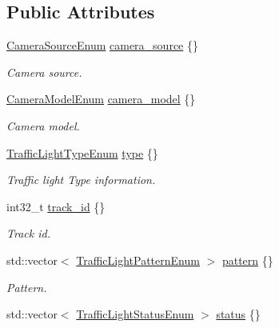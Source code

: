 \subsection*{Public Attributes}
\begin{DoxyCompactItemize}
\item 
\hyperlink{structmaf__perception__interface_1_1CameraSourceEnum}{Camera\+Source\+Enum} \hyperlink{structmaf__perception__interface_1_1TrafficLightMultiFrame_a334b0338a8a394dc246f11ebe67a1112}{camera\+\_\+source} \{\}
\begin{DoxyCompactList}\small\item\em Camera source. \end{DoxyCompactList}\item 
\hyperlink{structmaf__perception__interface_1_1CameraModelEnum}{Camera\+Model\+Enum} \hyperlink{structmaf__perception__interface_1_1TrafficLightMultiFrame_a33c441008015df1522483745efd46dac}{camera\+\_\+model} \{\}
\begin{DoxyCompactList}\small\item\em Camera model. \end{DoxyCompactList}\item 
\hyperlink{structmaf__perception__interface_1_1TrafficLightTypeEnum}{Traffic\+Light\+Type\+Enum} \hyperlink{structmaf__perception__interface_1_1TrafficLightMultiFrame_ac94d2b175b16689e25d5ba992bbada1c}{type} \{\}
\begin{DoxyCompactList}\small\item\em Traffic light Type information. \end{DoxyCompactList}\item 
int32\+\_\+t \hyperlink{structmaf__perception__interface_1_1TrafficLightMultiFrame_a77394e5afb1b785b596250eb89a7bc5e}{track\+\_\+id} \{\}
\begin{DoxyCompactList}\small\item\em Track id. \end{DoxyCompactList}\item 
std\+::vector$<$ \hyperlink{structmaf__perception__interface_1_1TrafficLightPatternEnum}{Traffic\+Light\+Pattern\+Enum} $>$ \hyperlink{structmaf__perception__interface_1_1TrafficLightMultiFrame_a9fc087ee5341cd8603e74ba43d36242c}{pattern} \{\}
\begin{DoxyCompactList}\small\item\em Pattern. \end{DoxyCompactList}\item 
std\+::vector$<$ \hyperlink{structmaf__perception__interface_1_1TrafficLightStatusEnum}{Traffic\+Light\+Status\+Enum} $>$ \hyperlink{structmaf__perception__interface_1_1TrafficLightMultiFrame_a74c62c1f073e1e7a3f6f0a6d8ab25a42}{status} \{\}

\end{DoxyCompactItemize}
